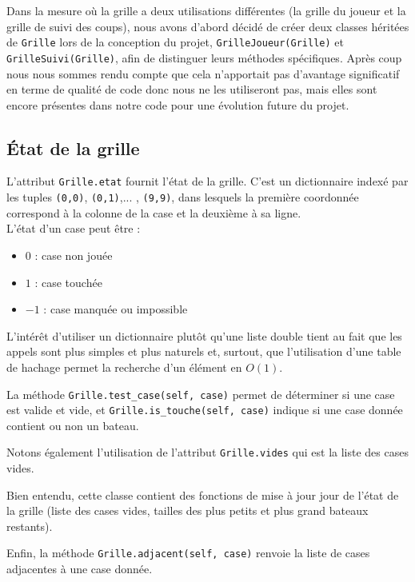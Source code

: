 Dans la mesure où la grille a deux utilisations différentes (la grille du joueur et la grille de suivi des coups), nous avons d'abord décidé de créer deux classes héritées de \texttt{Grille} lors de la conception du projet, \texttt{GrilleJoueur(Grille)} et \texttt{GrilleSuivi(Grille)}, afin de distinguer leurs méthodes spécifiques. Après coup nous nous sommes rendu compte que cela n'apportait pas d'avantage significatif en terme de qualité de code donc nous ne les utiliseront pas, mais elles sont encore présentes dans notre code pour une évolution future du projet.

\subsection{État de la grille}

L'attribut \texttt{Grille.etat} fournit l'état de la grille. C'est un dictionnaire indexé par les tuples \texttt{(0,0)}, \texttt{(0,1)},... , \texttt{(9,9)}, dans lesquels la première coordonnée correspond à la colonne de la case et la deuxième à sa ligne.\\
L'état d'un case peut être :
\begin{itemize}
\item $0$ : case non jouée
\item $1$ : case touchée
\item $-1$ : case manquée ou impossible
\end{itemize}
L'intérêt d'utiliser un dictionnaire plutôt qu'une liste double tient au fait que les appels sont plus simples et plus naturels et, surtout, que l'utilisation d'une table de hachage permet la recherche d'un élément en $O(1)$.  

La méthode \texttt{Grille.test\_case(self, case)} permet de déterminer si une case est valide et vide, et \texttt{Grille.is\_touche(self, case)} indique si une case donnée contient ou non un bateau.

Notons également l'utilisation de l'attribut \texttt{Grille.vides} qui est la liste des cases vides.

Bien entendu, cette classe contient des fonctions de mise à jour jour de l'état de la grille (liste des cases vides, tailles des plus petits et plus grand bateaux restants).

Enfin, la méthode \texttt{Grille.adjacent(self, case)} renvoie la liste de cases adjacentes à une case donnée.

